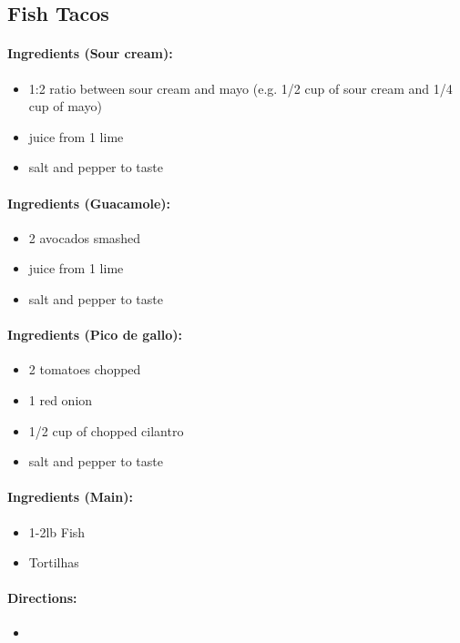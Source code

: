 \documentclass{article}
\begin{document}
\subsection{Fish Tacos}{}

\paragraph{Ingredients (Sour cream):}
\begin{itemize}
	\item 1:2 ratio between sour cream and mayo (e.g. 1/2 cup of sour cream and 1/4 cup of mayo)
	\item juice from 1 lime
	\item salt and pepper to taste
\end{itemize}

\paragraph{Ingredients (Guacamole):}
\begin{itemize}
	\item 2 avocados smashed
	\item juice from 1 lime
	\item salt and pepper to taste
\end{itemize}

\paragraph{Ingredients (Pico de gallo):}
\begin{itemize}
	\item 2 tomatoes chopped
	\item 1 red onion
	\item 1/2 cup of chopped cilantro
	\item salt and pepper to taste
\end{itemize}

\paragraph{Ingredients (Main):}
\begin{itemize}
	\item 1-2lb Fish
	\item Tortilhas
\end{itemize}

\paragraph{Directions:}
\begin{itemize}
	\item
\end{itemize}
\end{document}
